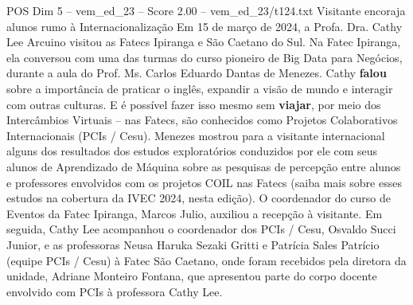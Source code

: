 \begin{textsample}{POS Dim 5 – vem\_ed\_23 – Score 2.00 – vem\_ed\_23/t124.txt}  \label{ex:f5_pos_067}
Visitante encoraja alunos rumo à Internacionalização Em 15 de março de 2024, a Profa.
Dra.
Cathy Lee Arcuino visitou as Fatecs Ipiranga e São Caetano do Sul.
Na Fatec Ipiranga, ela conversou com uma das turmas do curso pioneiro de Big Data para Negócios, durante a aula do Prof.
Ms.
Carlos Eduardo Dantas de Menezes.
Cathy \textbf{falou} sobre a importância de praticar o inglês, expandir a visão de mundo e interagir com outras culturas.
E é possível fazer isso mesmo sem \textbf{viajar}, por meio dos Intercâmbios Virtuais – nas Fatecs, são conhecidos como Projetos Colaborativos Internacionais (PCIs / Cesu).
Menezes mostrou para a visitante internacional alguns dos resultados dos estudos exploratórios conduzidos por ele com seus alunos de Aprendizado de Máquina sobre as pesquisas de percepção entre alunos e professores envolvidos com os projetos COIL nas Fatecs (saiba mais sobre esses estudos na cobertura da IVEC 2024, nesta edição).
O coordenador do curso de Eventos da Fatec Ipiranga, Marcos Julio, auxiliou a recepção à visitante.
Em seguida, Cathy Lee acompanhou o coordenador dos PCIs / Cesu, Osvaldo Succi Junior, e as professoras Neusa Haruka Sezaki Gritti e Patrícia Sales Patrício (equipe PCIs / Cesu) à Fatec São Caetano, onde foram recebidos pela diretora da unidade, Adriane Monteiro Fontana, que apresentou parte do corpo docente envolvido com PCIs à professora Cathy Lee.

\end{textsample}

